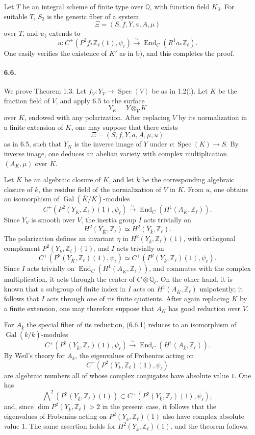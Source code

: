 \documentclass[10pt]{article}
\newcommand{\Q}{\mathbb{Q}}
\newcommand{\Z}{\mathbb{Z}}
\newcommand{\Gal}{\operatorname{Gal}}
\newcommand{\Spec}{\operatorname{Spec}}
\newcommand{\End}{\operatorname{End}}
\newcommand{\iso}{\xrightarrow{\sim}}
\begin{document}
Let $T$ be an integral scheme of finite type over $\Q$, with function field $K_3$. For suitable $T$, $S_3$ is the generic fiber of a system
\[
\Xi=(S,f,Y,a,A,\mu)
\]
over $T$, and $u_3$ extends to
\[
u:C^+(P^2f_*\Z_\ell(1),\psi_\ell)\iso \End_C(R^1a_*\Z_\ell).
\]
One easily verifies the existence of $K'$ as in b), and this completes the proof.

\paragraph{6.6.} We prove Theorem 1.3. Let $f_V:Y_V\to\Spec(V)$ be as in 1.2(i). Let $K$ be the fraction field of $V$, and apply 6.5 to the surface
\[
Y_K=Y\otimes_VK
\]
over $K$, endowed with any polarization. After replacing $V$ by its normalization in a finite extension of $K$, one may suppose that there exists
\[
\Xi=(S,f,Y,a,A,\mu,u)
\]
as in 6.5, such that $Y_K$ is the inverse image of $Y$ under $v:\Spec(K)\to S$. By inverse image, one deduces an abelian variety with complex multiplication $(A_K,\mu)$ over $K$.

Let $\overline K$ be an algebraic closure of $K$, and let $\overline k$ be the corresponding algebraic closure of $k$, the residue field of the normalization of $V$ in $\overline K$. From $u$, one obtains an isomorphism of $\Gal(\overline K/K)$-modules
\[
\tag{6.6.1}
C^+(P^2(Y_{\overline K},\Z_\ell)(1),\psi_\ell)\iso
\End_C(H^1(A_{\overline K},\Z_\ell)).
\]
Since $Y_V$ is smooth over $V$, the inertia group $I$ acts trivially on
\[
H^2(Y_{\overline K},\Z_\ell)\simeq H^2(Y_{\overline k},\Z_\ell).
\]
The polarization defines an invariant $\eta$ in $H^2(Y_{\overline k},\Z_\ell)(1)$, with orthogonal complement $P^2(Y_{\overline k},\Z_\ell)(1)$, and $I$ acts trivially on
\[
C^+(P^2(Y_{\overline K},\Z_\ell)(1),\psi_\ell)\simeq
C^+(P^2(Y_{\overline k},\Z_\ell)(1),\psi_\ell).
\]
Since $I$ acts trivially on $\End_C(H^1(A_{\overline K},\Z_\ell))$, and commutes with the complex multiplication, it acts through the center of $C\otimes\Q_\ell$. On the other hand, it is known that a subgroup of finite index in $I$ acts on $H^1(A_{\overline K},\Z_\ell)$ unipotently; it follows that $I$ acts through one of its finite quotients. After again replacing $K$ by a finite extension, one may therefore suppose that $A_K$ has good reduction over $V$.

For $A_{\overline k}$ the special fiber of its reduction, (6.6.1) reduces to an isomorphism of $\Gal(\overline k/k)$-modules
\[
\tag{6.6.2}
C^+(P^2(Y_{\overline k},\Z_\ell)(1),\psi_\ell)\iso
\End_C(H^1(A_{\overline k},\Z_\ell)).
\]
By Weil's theory for $A_k$, the eigenvalues of Frobenius acting on
\[
C^+(P^2(Y_{\overline k},\Z_\ell)(1),\psi_\ell)
\]
are algebraic numbers all of whose complex conjugates have absolute value $1$. One has
\[
\bigwedge\nolimits^2(P^2(Y_{\overline k},\Z_\ell)(1))\subset
C^+(P^2(Y_{\overline k},\Z_\ell)(1),\psi_\ell),
\]
and, since $\dim P^2(Y_{\overline k},\Z_\ell)>2$ in the present case, it follows that the eigenvalues of Frobenius acting on $P^2(Y_{\overline k},\Z_\ell)(1)$ also have complex absolute value $1$. The same assertion holds for $H^2(Y_{\overline k},\Z_\ell)(1)$, and the theorem follows.
\end{document}
